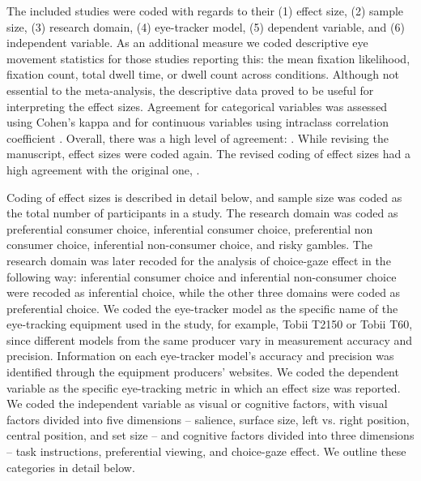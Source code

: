 The included studies were coded with regards to their (1) effect size, (2) sample size, (3) research domain, (4) eye-tracker model, (5) dependent variable, and (6) independent variable. As an additional measure we coded descriptive eye movement statistics for those studies reporting this: the mean fixation likelihood, fixation count, total dwell time, or dwell count across conditions. Although not essential to the meta-analysis, the descriptive data proved to be useful for interpreting the effect sizes. 
Agreement for categorical variables was assessed using Cohen's kappa and for continuous variables using intraclass correlation coefficient \citep{shrout1979a}. Overall, there was a high level of agreement: \unskip. While revising the manuscript, effect sizes were coded again. The revised coding of effect sizes had a high agreement with the original one,  \unskip. 

Coding of effect sizes is described in detail below, and sample size was coded as the total number of participants in a study. The research domain was coded as preferential consumer choice, inferential consumer choice, preferential non consumer choice, inferential non-consumer choice, and risky gambles. The research domain was later recoded for the analysis of choice-gaze effect in the following way: inferential consumer choice and inferential non-consumer choice were recoded as inferential choice, while the other three domains were coded as preferential choice. We coded the eye-tracker model as the specific name of the eye-tracking equipment used in the study, for example, Tobii T2150 or Tobii T60, since different models from the same producer vary in measurement accuracy and precision. Information on each eye-tracker model's accuracy and precision was identified through the equipment producers' websites. We coded the dependent variable as the specific eye-tracking metric in which an effect size was reported. We coded the independent variable as visual or cognitive factors, with visual factors divided into five dimensions -- salience, surface size, left vs. right position, central position, and set size -- and cognitive factors divided into three dimensions -- task instructions, preferential viewing, and choice-gaze effect. We outline these categories in detail below. 

